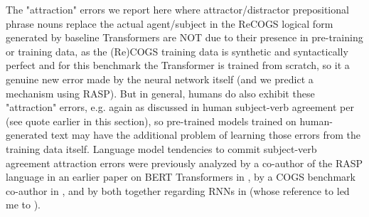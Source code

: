 \documentclass[11pt]{article}
\begin{document}
The "attraction" errors we report here where attractor/distractor prepositional phrase nouns replace the actual agent/subject in the ReCOGS logical form generated by \cite{Wu2023} baseline Transformers are NOT due to their presence in pre-training or training data, as the (Re)COGS training data is synthetic and syntactically perfect and for this benchmark the Transformer is trained from scratch, so it a genuine new error made by the neural network itself (and we predict a mechanism using RASP). But in general, humans do also exhibit these "attraction" errors, e.g. again as discussed in human subject-verb agreement per \cite{jespersen1913modernenglishgrammar1954reprint} (see quote earlier in this section), so pre-trained models trained on human-generated text may have the additional problem of learning those errors from the training data itself. Language model tendencies to commit subject-verb agreement attraction errors were previously analyzed by a co-author of the RASP language in an earlier paper on BERT Transformers in \cite{goldberg2019assessingbertssyntacticabilities}, by a COGS benchmark co-author in \cite{vanschijndel2019quantitydoesntbuyquality}, and by both together regarding RNNs in \cite{linzen2016assessing} (whose reference to \cite{agreementwithnearestlanguagelog} led me to \cite{jespersen1913modernenglishgrammar1954reprint}).
\end{document}
